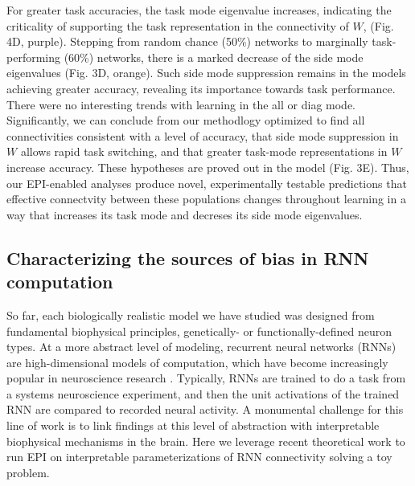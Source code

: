 \documentclass[11pt]{article}
\begin{document}
For greater task accuracies, the task mode eigenvalue increases, indicating the criticality of supporting the task representation in the connectivity of $W$, (Fig. 4D, purple).  Stepping from random chance (50\%) networks to marginally task-performing (60\%) networks, there is a marked decrease of the side mode eigenvalues (Fig. 3D, orange).  Such side mode suppression remains in the models achieving greater accuracy, revealing its importance towards task performance.   There were no interesting trends with learning in the all or diag mode. Significantly, we can conclude from our methodlogy optimized to find all connectivities consistent with a level of accuracy, that side mode suppression in $W$ allows rapid task switching, and that greater task-mode representations in $W$ increase accuracy.  These hypotheses are proved out in the model (Fig. 3E).  Thus, our EPI-enabled analyses produce novel, experimentally testable predictions that effective connectvity between these populations changes throughout learning in a way that increases its task mode and decreses its side mode eigenvalues.

\subsection{Characterizing the sources of bias in RNN computation} \label{results_RNN}
So far, each biologically realistic model we have studied was designed from fundamental biophysical principles, genetically- or functionally-defined neuron types.  
At a more abstract level of modeling, recurrent neural networks (RNNs) are high-dimensional models of computation, which have become increasingly popular in neuroscience research \cite{barak2017recurrent}. 
Typically, RNNs are trained to do a task from a systems neuroscience experiment, and then the unit activations of the trained RNN are compared to recorded neural activity. 
A monumental challenge for this line of work is to link findings at this level of abstraction with interpretable biophysical mechanisms in the brain.  Here we leverage recent theoretical work to run EPI on interpretable parameterizations of RNN connectivity solving a toy problem.
 
\end{document}
